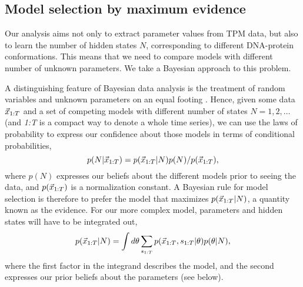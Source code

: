 \subsection{Model selection by maximum evidence}
Our analysis aims not only to extract parameter values from TPM data,
but also to learn the number of hidden states $N$, corresponding to
different DNA-protein conformations. This means that we need to
compare models with different number of unknown parameters.  We take a
Bayesian approach to this problem.

A distinguishing feature of Bayesian data analysis is the treatment of
random variables and unknown parameters on an equal footing
\cite{eddy2004,mackay2003}. 
Hence, given some data $\vec{x}_{1:T}$ and a set of competing models with
different number of states $N=1,2,\ldots$ (and \mbox{\textit{1:T}} is
a compact way to denote a whole time series), we can use the laws
of probability to express our confidence about those models in terms
of conditional probabilities,
\begin{equation}
  p(N|\vec{x}_{1:T})=p(\vec{x}_{1:T}|N)p(N)/p(\vec{x}_{1:T}),
\end{equation}
where $p(N)$ expresses our beliefs about the different models prior to
seeing the data, and $p(\vec{x}_{1:T})$ is a normalization constant. A
Bayesian rule for model selection is therefore to prefer the model
that maximizes $p(\vec{x}_{1:T}|N)$, a quantity known as the evidence. For
our more complex model, parameters and hidden states will have to be
integrated out,
\begin{equation}\label{eq:evidencedef}
  p(\vec{x}_{1:T}|N)=\int d\theta\sum_{s_{1:T}} p(\vec{x}_{1:T},s_{1:T}|\theta)p(\theta|N),
\end{equation}
where the first factor in the integrand describes the model, and the
second expresses our prior beliefs about the parameters (see
below).

